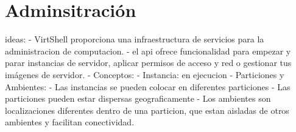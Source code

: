 \chapter{Adminsitración}
\label{capadministracion}


ideas:
- VirtShell proporciona una infraestructura de servicios para la administracion de computacion.
- el api ofrece funcionalidad para empezar y parar instancias de servidor, aplicar permisos de acceso y red o gestionar tus imágenes de servidor.
- Conceptos:
	- Instancia: en ejecucion
	- Particiones y Ambientes:
		- Las instancias se pueden colocar en diferentes particiones
		- Las particiones pueden estar dispersas geograficamente
		- Los ambientes son localizaciones diferentes dentro de una particion, que estan aisladas de 
		  otros ambientes y facilitan conectividad.